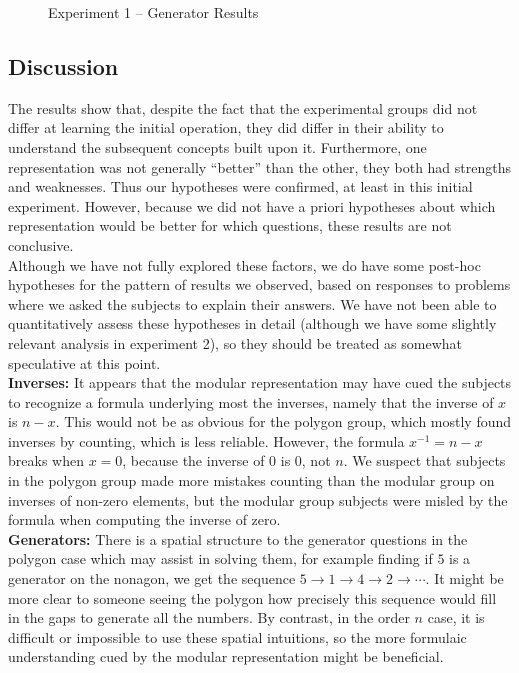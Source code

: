 \documentclass[11pt]{article}
\begin{document}
\begin{figure}[H]
\begin{subfigure}[c]{0.4\textwidth}
\end{subfigure}
\caption{Experiment 1 -- Generator Results}
\label{ex1_gen}
\end{figure}\noindent 
\subsection{Discussion}
The results show that, despite the fact that the experimental groups did not differ at learning the initial operation, they did differ in their ability to understand the subsequent concepts built upon it. Furthermore, one representation was not generally ``better'' than the other, they both had strengths and weaknesses. Thus our hypotheses were confirmed, at least in this initial experiment. However, because we did not have a priori hypotheses about which representation would be better for which questions, these results are not conclusive. \\[11pt]
Although we have not fully explored these factors, we do have some post-hoc hypotheses for the pattern of results we observed, based on responses to problems where we asked the subjects to explain their answers. We have not been able to quantitatively assess these hypotheses in detail (although we have some slightly relevant analysis in experiment 2), so they should be treated as somewhat speculative at this point.\\[11pt]
\textbf{Inverses:} It appears that the modular representation may have cued the subjects to recognize a formula underlying most the inverses, namely that the inverse of $x$ is $n-x$. This would not be as obvious for the polygon group, which mostly found inverses by counting, which is less reliable. However, the formula $x^{-1} = n-x$ breaks when $x = 0$, because the inverse of $0$ is $0$, not $n$. We suspect that subjects in the polygon group made more mistakes counting than the modular group on inverses of non-zero elements, but the modular group subjects were misled by the formula when computing the inverse of zero. \\[11pt]
\textbf{Generators:} There is a spatial structure to the generator questions in the polygon case which may assist in solving them, for example finding if $5$ is a generator on the nonagon, we get the sequence $5 \rightarrow 1 \rightarrow 4 \rightarrow 2 \rightarrow \cdots$. It might be more clear to someone seeing the polygon how precisely this sequence would fill in the gaps to generate all the numbers. By contrast, in the order $n$ case, it is difficult or impossible to use these spatial intuitions, so the more formulaic understanding cued by the modular representation might be beneficial.
\end{document}
